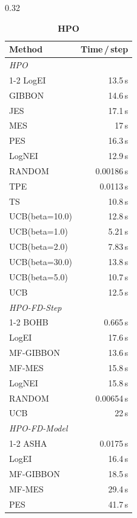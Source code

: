 \begin{table}[h]
  \centering
  \caption{Mean wall-clock time per BO step per method and problem.}
  \label{tab:wall_clock}
  \begin{subtable}[t]{0.32\textwidth}
    \centering
    \footnotesize
    \caption{\textbf{HPO}}
    \begin{tabular}{lr}
      \toprule
      \textbf{Method} & \textbf{Time\,/\,step} \\
      \midrule
      \multicolumn{2}{l}{\textit{HPO}} \\
      \cmidrule{1-2}
      LogEI & 13.5\,s \\
      GIBBON & 14.6\,s \\
      JES & 17.1\,s \\
      MES & 17\,s \\
      PES & 16.3\,s \\
      LogNEI & 12.9\,s \\
      RANDOM & 0.00186\,s \\
      TPE & 0.0113\,s \\
      TS & 10.8\,s \\
      UCB(beta=10.0) & 12.8\,s \\
      UCB(beta=1.0) & 5.21\,s \\
      UCB(beta=2.0) & 7.83\,s \\
      UCB(beta=30.0) & 13.8\,s \\
      UCB(beta=5.0) & 10.7\,s \\
      UCB & 12.5\,s \\
      \midrule
      \multicolumn{2}{l}{\textit{HPO-FD-Step}} \\
      \cmidrule{1-2}
      BOHB & 0.665\,s \\
      LogEI & 17.6\,s \\
      MF-GIBBON & 13.6\,s \\
      MF-MES & 15.8\,s \\
      LogNEI & 15.8\,s \\
      RANDOM & 0.00654\,s \\
      UCB & 22\,s \\
      \midrule
      \multicolumn{2}{l}{\textit{HPO-FD-Model}} \\
      \cmidrule{1-2}
      ASHA & 0.0175\,s \\
      LogEI & 16.4\,s \\
      MF-GIBBON & 18.5\,s \\
      MF-MES & 29.4\,s \\
      PES & 41.7\,s \\

\end{tabular}
\end{subtable}
\end{table}
